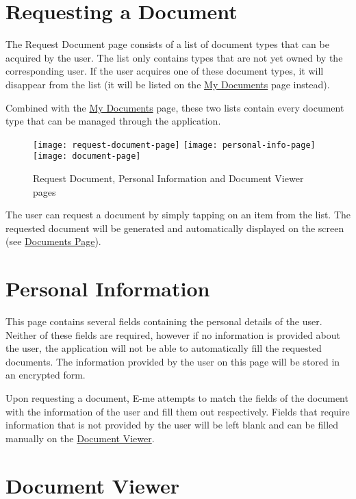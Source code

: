	\section{Requesting a Document}

	The Request Document page consists of a list of document types that can be acquired by the user.
	The list only contains types that are not yet owned by the corresponding user.
	If the user acquires one of these document types, it will disappear from the list (it will be listed on the \hyperref[documents]{My Documents} page instead).

	Combined with the \hyperref[documents]{My Documents} page, these two lists contain every document type that can be managed through the application. 
		\begin{figure}[h]
			\centering
			\texttt{[image: request-document-page]}				
			\texttt{[image: personal-info-page]}
			\texttt{[image: document-page]}
			\label{fig:document}
			\caption{Request Document, Personal Information and Document Viewer pages}
		\end{figure}

		The user can request a document by simply tapping on an item from the list. 
		The requested document will be generated and automatically displayed on the screen (see \hyperref[document]{Documents Page}).

	\section{Personal Information}

	This page contains several fields containing the personal details of the user. 
	Neither of these fields are required, however if no information is provided about the user, the application will not be able to automatically fill the requested documents.
	The information provided by the user on this page will be stored in an encrypted form.

	Upon requesting a document, E-me attempts to match the fields of the document with the information of the user and fill them out respectively.
	Fields that require information that is not provided by the user will be left blank and can be filled manually on the \hyperref[document]{Document Viewer}.

	\section{Document Viewer}\label{document}

